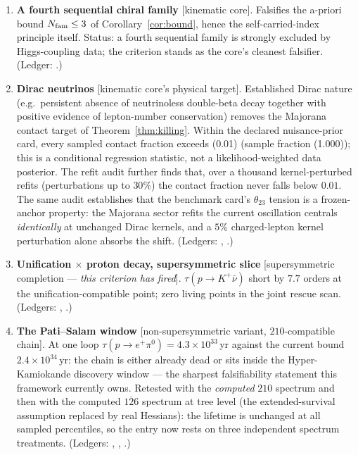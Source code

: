 \documentclass[
  aps,
  prd,
  preprint,
  nofootinbib,
  superscriptaddress,
  longbibliography
]{revtex4-2}
\begin{document}
\begin{enumerate}
\item[K1.] \textbf{A fourth sequential chiral family} [kinematic core].
Falsifies the a-priori bound \(N_{\rm fam}\le3\) of
Corollary~\ref{cor:bound}, hence the self-carried-index principle
itself.  Status: a fourth sequential family is strongly excluded by
Higgs-coupling data; the criterion stands as the core's cleanest
falsifier.  (Ledger: .)

\item[K2.] \textbf{Dirac neutrinos} [kinematic core's physical target].
Established Dirac nature (e.g.\ persistent absence of neutrinoless
double-beta decay together with positive evidence of lepton-number
conservation) removes the Majorana contact target of
Theorem~\ref{thm:killing}.  Within the declared nuisance-prior card,
every sampled contact fraction exceeds (0.01) (sample fraction (1.000));
this is a conditional regression statistic, not a likelihood-weighted data
posterior.  The refit audit further finds that, over a
thousand kernel-perturbed refits (perturbations up to \(30\%\)) the
contact fraction never falls below \(0.01\).  The same audit
establishes that the benchmark card's \(\theta_{23}\) tension is a
frozen-anchor property: the Majorana sector refits the current
oscillation centrals \emph{identically} at unchanged Dirac kernels,
and a \(5\%\) charged-lepton kernel perturbation alone absorbs the
shift.
(Ledgers: ,
.)

\item[K3.] \textbf{Unification \(\times\) proton decay, supersymmetric
slice} [supersymmetric completion --- \emph{this criterion has fired}].
\(\tau(p\to K^+\bar\nu)\) short by \(7.7\) orders at the
unification-compatible point; zero living points in the joint rescue
scan.  (Ledgers: ,
.)

\item[K4.] \textbf{The Pati--Salam window} [non-supersymmetric variant,
\(210\)-compatible chain].  At one loop
\(\tau(p\to e^+\pi^0)=4.3\times10^{33}\,\)yr against the current bound
\(2.4\times10^{34}\,\)yr: the chain is either already dead or sits
inside the Hyper-Kamiokande discovery window --- the sharpest
falsifiability statement this framework currently owns.  Retested with
the \emph{computed} \(210\) spectrum and then with the computed
\(\overline{126}\) spectrum at tree level (the extended-survival
assumption replaced by real Hessians): the lifetime is unchanged at
all sampled percentiles, so the entry now rests on three independent
spectrum treatments.
(Ledgers: ,
,
.)


\end{enumerate}
\end{document}
